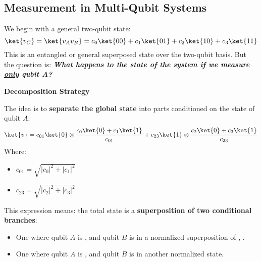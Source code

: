 \subsection{Measurement in Multi-Qubit Systems}

We begin with a general two-qubit state:
\begin{equation*}
    \ket{v_{C}} = \ket{v_{A} v_{B}} = c_{0}\ket{00} + c_{1}\ket{01} + c_{2} \ket{10} + c_{3} \ket{11}
\end{equation*}
This is an entangled or general superposed state over the two-qubit basis. But the question is: \textbf{\emph{What happens to the state of the system if we measure \underline{only} qubit A?}}

\highspace
\begin{flushleft}
    \textcolor{Green3}{ \textbf{Decomposition Strategy}}
\end{flushleft}
The idea is to \textbf{separate the global state} into parts conditioned on the state of qubit $A$:
\begin{equation*}
    \ket{v} = c_{01} \ket{0} \otimes \dfrac{c_{0}\ket{0} + c_{1}\ket{1}}{c_{01}} + c_{23}\ket{1} \otimes \dfrac{c_{2}\ket{0} + c_{3}\ket{1}}{c_{23}}
\end{equation*}
Where:
\begin{itemize}
    \item $c_{01} = \sqrt{\left|c_{0}\right|^{2} + \left|c_{1}\right|^{2}}$
    \item $c_{23} = \sqrt{\left|c_{2}\right|^{2} + \left|c_{3}\right|^{2}}$
\end{itemize}
This expression means: the total state is a \textbf{superposition of two conditional branches}:
\begin{itemize}
    \item One where qubit $A$ is , and qubit $B$ is in a normalized superposition of , .
    \item One where qubit $A$ is , and qubit $B$ is in another normalized state.
\end{itemize}

